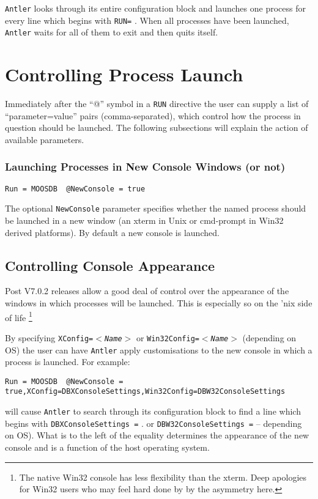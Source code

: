 \documentclass[a4paper,10pt]{article}
\newcommand{\Code}[1]{\texttt{#1} }
\newcommand{\code}[1]{\Code{#1} }
\begin{document}
\code{Antler} looks through its entire configuration block and launches one process for every line which begins with \code{RUN=}. When all processes have been launched, \code{Antler} waits for all of them to exit and then quits itself.



\section{Controlling Process Launch}

Immediately after the ``@'' symbol in a \code{RUN} directive the user can supply a list of ``parameter=value'' pairs (comma-separated), which control how the process in question should be launched. The following subsections will explain the action of available parameters.


\subsubsection{Launching Processes in New Console Windows (or not)}

\begin{lstlisting}
Run = MOOSDB  @NewConsole = true
\end{lstlisting}

The optional \code{NewConsole} parameter specifies whether the named process
should be launched in a new  window (an xterm in Unix or cmd-prompt in Win32 derived platforms). By default a new console is launched.

\subsection{Controlling Console Appearance}\label{Sec:Appearance}

Post V7.0.2 releases allow a good deal of control over the appearance of the windows in which processes will be launched. This is especially so on the 'nix side of life \footnote{The native Win32 console has less flexibility than the xterm. Deep apologies for Win32 users who may feel hard done by by the asymmetry here.}

By specifying \code{XConfig=$<$\it{Name}$>$} or \code{Win32Config=$<$\it{Name}$>$} (depending on OS) the user can have \code{Antler} apply customisations to the new console in which a process is launched. For example:
\begin{lstlisting}
Run = MOOSDB  @NewConsole = true,XConfig=DBXConsoleSettings,Win32Config=DBW32ConsoleSettings
\end{lstlisting}
will cause \code{Antler} to search through its configuration block to find a line which begins with \code{DBXConsoleSettings =}. or   \code{DBW32ConsoleSettings =} -- depending on OS). What is to the left of the equality determines the appearance of the new console and is a function of the host operating system.
\end{document}
